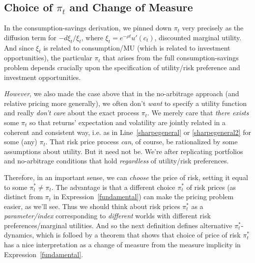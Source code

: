 \documentclass[12pt]{article}
\theoremstyle{plain}
\theoremstyle{definition}
\theoremstyle{remark}
\begin{document}
\clearpage
\subsection{Choice of $\pi_t$ and Change of Measure}

In the consumption-savings derivation, we pinned down $\pi_t$ very
precisely as the diffusion term for $-d\xi_t/\xi_t$, where
$\xi_t=e^{-\rho t}u'(c_t)$, discounted marginal utility.
And since $\xi_t$ is related to consumption/MU (which is related to
investment opportunities), the particular $\pi_t$ that arises from the
full consumption-savings problem depends crucially upon the
specification of utility/risk preference and investment opportunities.


\emph{However}, we also made the case above that in the no-arbitrage
approach (and relative pricing more generally), we often don't
\emph{want} to specify a utility function and really \emph{don't care}
about the exact process $\pi_t$.
We merely care that \emph{there exists} some $\pi_t$ so that returns'
expectation and volatility are jointly related in a coherent and
consistent way, i.e. as in Line~\ref{sharpegeneral} or
\ref{sharpegeneral2} for some (any) $\pi_t$.
That risk price process \emph{can}, of course, be rationalized by
some assumptions about utility. But it need not be.
We're after replicating portfolios and no-arbitrage conditions that hold
\emph{regardless} of utility/risk preferences.


Therefore, in an important sense, we can \emph{choose} the price of
risk, setting it equal to some $\pi_t^*\neq \pi_t$.
The advantage is that a different choice $\pi_t^*$ of risk prices (as
distinct from $\pi_t$ in Expression~\ref{fundamental}) can make the
pricing problem easier, as we'll see.
Thus we should think about risk prices $\pi_t^*$ as a
\emph{parameter/index} corresponding to \emph{different} worlds with
different risk preferences/marginal utilities.
And so the next definition defines alternative $\pi_t^*$-dynamics,
which is folloed by a theorem that shows that choice of price of risk
$\pi_t^*$ has a nice interpretation as a change of measure from the
measure implicity in Expression~\ref{fundamental}.
\end{document}
